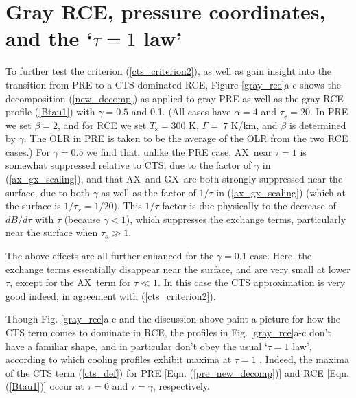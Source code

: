 \documentclass{ametsoc}
\newcommand{\eqnref}[1]{(\ref{#1})}
\newcommand{\Ts}{\ensuremath{T_\mathrm{s}}}
\newcommand{\taus}{\ensuremath{\tau_s}}
\newcommand{\AX}{\ensuremath{\mathrm{AX}}}
\newcommand{\GX}{\ensuremath{\mathrm{GX}}}
\newcommand{\CTS}{\ensuremath{\mathrm{CTS}}}
\begin{document}
\section{Gray RCE, pressure coordinates, and the `$\tau=1$ law'} \label{sec_gray_rce}
To further test the criterion \eqnref{cts_criterion2}, as well as gain insight into the transition from PRE to a CTS-dominated RCE, Figure \ref{gray_rce}a-c shows the decomposition \eqnref{new_decomp} as applied to gray PRE as well as the gray RCE profile \eqnref{Btau1} with $\gamma=0.5$ and 0.1. (All cases have $\alpha=4$ and $\taus=20$. In PRE we set $\beta=2$, and for RCE we set $\Ts = 300 $ K, $\Gamma=\ 7$ K/km, and $\beta$ is determined by $\gamma$. The OLR in PRE is taken to be the average of the OLR from the two RCE cases.) For $\gamma=0.5$ we find that, unlike the PRE case, \AX\ near $\tau=1$ is somewhat suppressed relative to \CTS, due to the factor of $\gamma$ in \eqnref{ax_gx_scaling}, and that \AX\ and \GX\ are both strongly suppressed near the surface, due to both $\gamma$ as well as the factor of $1/\tau$ in \eqnref{ax_gx_scaling} (which at the surface is $1/\taus = 1/20$). This $1/\tau$ factor is due physically to the decrease of $dB/d\tau$ with $\tau$ (because $\gamma<1$), which suppresses the exchange terms, particularly near the surface when $\taus \gg 1$.

The above effects are all further enhanced for the $\gamma=0.1$ case. Here, the exchange terms essentially disappear near the surface, and are very small at lower $\tau$, except for the \AX\ term for $\tau \ll 1$. In this case the CTS approximation is very good indeed, in agreement with \eqnref{cts_criterion2}.

Though Fig. \ref{gray_rce}a-c and the discussion above paint a picture for how the CTS term comes to dominate in RCE, the profiles in Fig. \ref{gray_rce}a-c don't have a familiar shape, and in particular don't obey the usual `$\tau=1$ law', according to which cooling profiles exhibit maxima at $\tau=1$  \citep[e.g.][see also Appendix B]{huang2014,wallace2006,petty2006}. Indeed, the maxima of the CTS term \eqnref{cts_def} for PRE  [Eqn. \eqnref{pre_new_decomp}] and RCE [Eqn. \eqnref{Btau1}] occur at $\tau=0$ and $\tau=\gamma$, respectively. 
\end{document}
